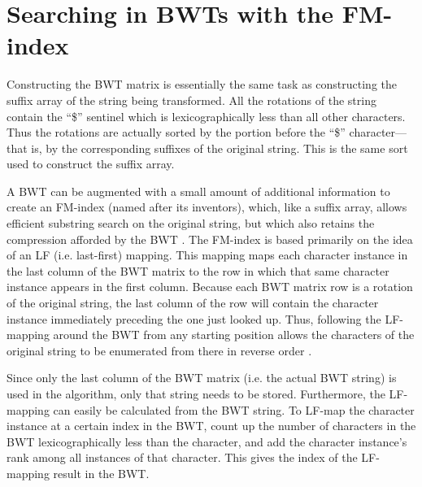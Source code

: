 \documentclass[11pt,proposal]{ucthesis}
\begin{document}
    
    
    
\section{Searching in BWTs with the FM-index}

Constructing the BWT matrix is essentially the same task as constructing the suffix array of the string being transformed. All the rotations of the string contain the ``\$'' sentinel which is lexicographically less than all other characters. Thus the rotations are actually sorted by the portion before the ``\$'' character---that is, by the corresponding suffixes of the original string. This is the same sort used to construct the suffix array.


A BWT can be augmented with a small amount of additional information to create an FM-index (named after its inventors), which, like a suffix array, allows efficient substring search on the original string, but which also retains the compression afforded by the BWT \cite{ferragina2000opportunistic}. The FM-index is based primarily on the idea of an LF (i.e. last-first) mapping. This mapping maps each character instance in the last column of the BWT matrix to the row in which that same character instance appears in the first column. Because each BWT matrix row is a rotation of the original string, the last column of the row will contain the character instance immediately preceding the one just looked up. Thus, following the LF-mapping around the BWT from any starting position allows the characters of the original string to be enumerated from there in reverse order \cite{ferragina2000opportunistic}.

Since only the last column of the BWT matrix (i.e. the actual BWT string) is used in the algorithm, only that string needs to be stored. Furthermore, the LF-mapping can easily be calculated from the BWT string. To LF-map the character instance at a certain index in the BWT, count up the number of characters in the BWT lexicographically less than the character, and add the character instance's rank among all instances of that character. This gives the index of the LF-mapping result in the BWT.
\end{document}
